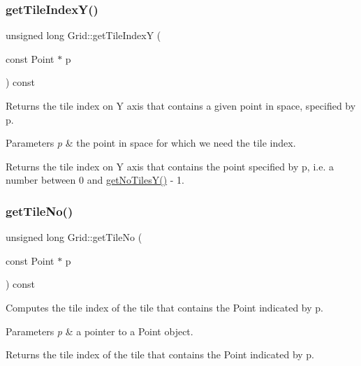 \subsubsection{\texorpdfstring{get\+Tile\+Index\+Y()}{getTileIndexY()}\hspace{0.1cm}{\footnotesize\ttfamily [2/2]}}
{\footnotesize\ttfamily unsigned long Grid\+::get\+Tile\+IndexY (\begin{DoxyParamCaption}\item[{const Point $\ast$}]{p }\end{DoxyParamCaption}) const\hspace{0.3cm}{\ttfamily [private]}}

Returns the tile index on Y axis that contains a given point in space, specified by p. 
\begin{DoxyParams}{Parameters}
{\em p} & the point in space for which we need the tile index. \\
\hline
\end{DoxyParams}
\begin{DoxyReturn}{Returns}
the tile index on Y axis that contains the point specified by p, i.\+e. a number between 0 and \hyperlink{class_grid_a783a3153d03154cfd33e6a418bb8d390}{get\+No\+Tiles\+Y()} -\/ 1. 
\end{DoxyReturn}
\mbox{\label{class_grid_a93e42713b7af1f188ce90f92a5e202ab}} 
\subsubsection{\texorpdfstring{get\+Tile\+No()}{getTileNo()}\hspace{0.1cm}{\footnotesize\ttfamily [1/2]}}
{\footnotesize\ttfamily unsigned long Grid\+::get\+Tile\+No (\begin{DoxyParamCaption}\item[{const Point $\ast$}]{p }\end{DoxyParamCaption}) const}

Computes the tile index of the tile that contains the Point indicated by p. 
\begin{DoxyParams}{Parameters}
{\em p} & a pointer to a Point object. \\
\hline
\end{DoxyParams}
\begin{DoxyReturn}{Returns}
the tile index of the tile that contains the Point indicated by p. 
\end{DoxyReturn}
\mbox{\label{class_grid_a02dee9ad3ee575623916c0041f72eb5e}} 
